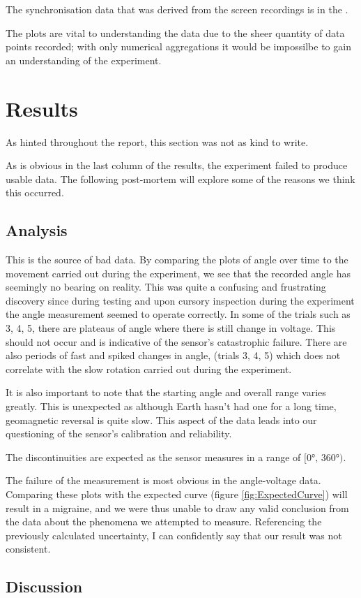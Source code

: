 The synchronisation data that was derived from the screen recordings is in the .

The plots are vital to understanding the data due to the sheer quantity of data points recorded; with only numerical aggregations it would be impossilbe to gain an understanding of the experiment.



\section*{Results}

As hinted throughout the report, this section was not as kind to write. 

As is obvious in the last column of the results, the experiment failed to produce usable data. The following post-mortem will explore some of the reasons we think this occurred.

\subsection*{Analysis}

This is the source of bad data. By comparing the plots of angle over time to the movement carried out during the experiment, we see that the recorded angle has seemingly no bearing on reality. This was quite a confusing and frustrating discovery since during testing and upon cursory inspection during the experiment the angle measurement seemed to operate correctly. 
In some of the trials such as 3, 4, 5, there are plateaus of angle where there is still change in voltage. This should not occur and is indicative of the sensor's catastrophic failure. There are also periods of fast and spiked changes in angle, (trials 3, 4, 5) which does not correlate with the slow rotation carried out during the experiment.

It is also important to note that the starting angle and overall range varies greatly. This is unexpected as although Earth hasn't had one for a long time, geomagnetic reversal is quite slow. This aspect of the data leads into our questioning of the sensor's calibration and reliability.

The discontinuities are expected as the sensor measures in a range of $[0°, \, 360°)$.

The failure of the measurement is most obvious in the angle-voltage data. Comparing these plots with the expected curve (figure \ref{fig:ExpectedCurve}) will result in a migraine, and we were thus unable to draw any valid conclusion from the data about the phenomena we attempted to measure. Referencing the previously calculated uncertainty, I can confidently say that our result was not consistent.

\subsection*{Discussion}







